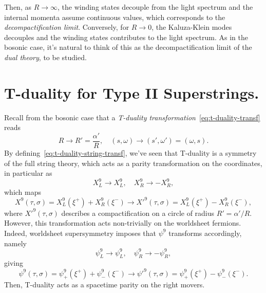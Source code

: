 Then, as $R \to \infty$, the winding states decouple from the light spectrum and the internal momenta assume continuous values, which corresponds to the \emph{decompactification limit}. Conversely, for $R \to 0$, the Kaluza-Klein modes decouples and the winding states contributes to the light spectrum. As in the bosonic case, it's natural to think of this as the decompactification limit of the \emph{dual theory}, to be studied.

\section{T-duality for Type II Superstrings.}
Recall from the bosonic case that a \emph{T-duality transformation}~\eqref{eq:t-duality-transf} reads
\begin{equation}\label{eq:superstring-t-duality-transf}
    R \to R' = \frac{\alpha'}{R}, \quad (s,\omega) \to (s',\omega') = (\omega, s) .
\end{equation}
By defining~\eqref{eq:t-duality-string-transf}, we've seen that T-duality is a symmetry of the full string theory, which acts as a parity transformation on the coordinates, in particular as
\begin{equation}
    X^9_L \to X^9_L, \quad X^9_R \to - X^9_R,
\end{equation}
which maps
\begin{equation}
    X^9(\tau, \sigma) = X^9_L(\xi^+) + X^9_R(\xi^-) \to X'^9(\tau,\sigma) = X^9_L(\xi^+) - X^9_R(\xi^-),
\end{equation}
where $X'^9(\tau,\sigma)$ describes a compactification on a circle of radius $R' = \alpha' / R$. However, this transformation acts non-trivially on the worldsheet fermions. Indeed, worldsheet supersymmetry imposes that $\psi^9$ transforms accordingly, namely
\begin{equation}\label{eq:t-duality-on-fermions}
    \psi^9_L \to \psi^9_L, \quad \psi^9_R \to - \psi^9_R,
\end{equation}
giving
\begin{equation}
    \psi^9(\tau,\sigma) = \psi^9_+(\xi^+) + \psi^9_-(\xi^-) \to \psi'^9(\tau,\sigma) = \psi^9_+(\xi^+) - \psi^9_-(\xi^-).
\end{equation}
Then, T-duality acts as a spacetime parity on the right movers.

